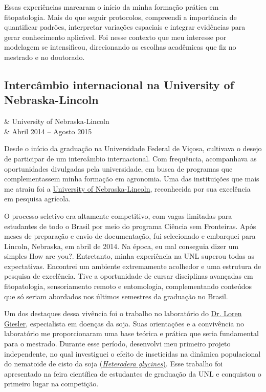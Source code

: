 \documentclass[12pt,a4paper,oneside]{book}
\newcommand{\UFV}{Universidade Federal de Viçosa}
\newcommand{\UNL}{University of Nebraska-Lincoln}
\begin{document}
Essas experiências marcaram o início da minha formação prática em fitopatologia. Mais do que seguir protocolos, compreendi a importância
de quantificar padrões, interpretar variações espaciais e integrar evidências para gerar conhecimento 
aplicável. Foi nesse contexto que meu interesse por modelagem se intensificou, direcionando as
escolhas acadêmicas que fiz no mestrado e no doutorado.

\subsection{Intercâmbio internacional na \UNL{}}
\label{sec_inter}

\begin{subsummarybox}[frametitle=\faPlane{}\quad Intercâmbio internacional]
\begin{fa-ul}
\faUniversity & \UNL{}\\
\faCalendar & Abril 2014 -- Agosto 2015
\end{fa-ul}
\end{subsummarybox}

Desde o início da graduação na \UFV{}, cultivava o desejo de participar de um intercâmbio internacional. Com 
frequência, acompanhava as oportunidades divulgadas pela universidade, em busca de programas que 
complementassem minha formação em agronomia. Uma das instituições que mais me atraiu foi 
a \href{https://www.unl.edu/}{\UNL{}}, reconhecida por sua excelência em pesquisa agrícola.

O processo seletivo era altamente competitivo, com vagas limitadas para estudantes de todo o Brasil 
por meio do programa Ciência sem Fronteiras. Após meses de preparação e envio de documentação, fui 
selecionado e embarquei para Lincoln, Nebraska, em abril de 2014. Na época, eu mal conseguia dizer um 
simples How are you?. Entretanto, minha experiência na UNL superou todas as expectativas. Encontrei um ambiente extremamente acolhedor e uma estrutura de pesquisa de 
excelência. Tive a oportunidade de cursar disciplinas avançadas em fitopatologia, sensoriamento 
remoto e entomologia, complementando conteúdos que só seriam abordados nos últimos semestres da 
graduação no Brasil.

Um dos destaques dessa vivência foi o trabalho no laboratório do \href{https://plantpathology.unl.edu/person/loren-giesler/}{Dr. Loren Giesler}, 
especialista em doenças da soja. Suas orientações e a convivência no laboratório me proporcionaram uma 
base teórica e prática que seria fundamental para o mestrado. Durante esse período, desenvolvi meu primeiro 
projeto independente, no qual investiguei o efeito de inseticidas na dinâmica populacional do 
nematoide de cisto da soja \href{https://en.wikipedia.org/wiki/Soybean_cyst_nematode}{(\textit{Heterodera glycines})}. 
Esse trabalho foi apresentado na feira científica de estudantes de graduação da UNL e conquistou o 
primeiro lugar na competição.
\end{document}
